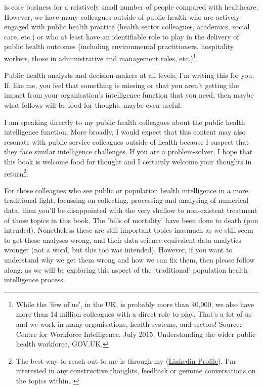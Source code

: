  is core business for a relatively small number of people compared with healthcare. However, we have many colleagues outside of public health who are actively engaged with public health practice (health sector colleagues, academics, social care, etc.) or who at least have an identifiable role to play in the delivery of public health outcomes (including environmental practitioners, hospitality workers, those in administrative and management roles, etc.)\footnote{While the 'few of us', in the UK, is probably more than 40,000, we also have more than 14 million colleagues with a direct role to play. That's a lot of us and we work in many organisations, health systems, and sectors! Source: Centre for Workforce Intelligence. July 2015. Understanding the wider public health workforce, GOV.UK.}.

Public health analysts and decision-makers at all levels, I'm writing this for you. If, like me, you feel that something is missing or that you aren't getting the impact from your organisation's intelligence function that you need, then maybe what follows will be food for thought, maybe even useful.

I am speaking directly to my public health colleagues about the public health intelligence function. More broadly, I would expect that this content may also resonate with public service colleagues outside of health because I suspect that they face similar intelligence challenges. If you are a problem-solver, I hope that this book is welcome food for thought and I certainly welcome your thoughts in return\footnote{The best way to reach out to me is through my (\href{https://www.linkedin.com/in/wchrrisskelly}{Linkedin Profile}). I'm interested in any constructive thoughts, feedback or genuine conversations on the topics within\ldots}.

For those colleagues who see public or population health intelligence in a more traditional light, focussing on collecting, processing and analysing of numerical data, then you'll be disappointed with the very shallow to non-existent treatment of those topics in this book. The 'bills of mortality' have been done to death (pun intended). Nonetheless these are still important topics inasmuch as we still seem to get these analyses wrong, and their data science equivalent data analytics wronger (not a word, but this too was intended). However, if you want to understand why we get them wrong and how we can fix them, then please follow along, as we will be exploring this aspect of the 'traditional' population health intelligence process.



